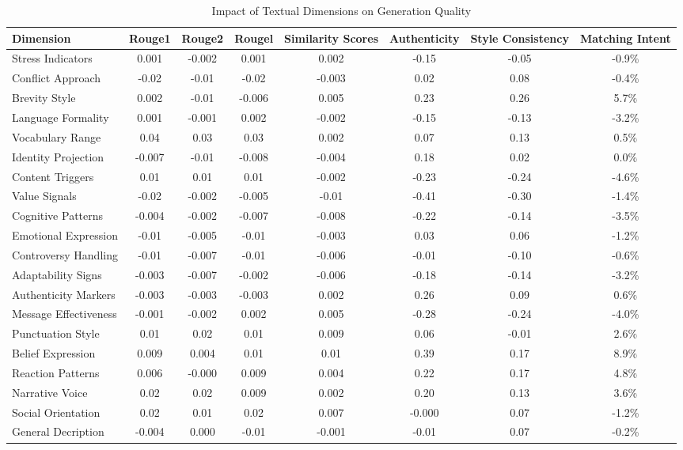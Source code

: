 \begin{table}
\caption{Impact of Textual Dimensions on Generation Quality}
\label{table1}
\begin{tabular}{lccccccc}
\hline
Dimension & Rouge1 & Rouge2 & Rougel & Similarity Scores & Authenticity & Style Consistency & Matching Intent \\
\hline
Stress Indicators & 0.001 & -0.002 & 0.001 & 0.002 & -0.15 & -0.05 & -0.9\% \\
Conflict Approach & -0.02 & -0.01 & -0.02 & -0.003 & 0.02 & 0.08 & -0.4\% \\
Brevity Style & 0.002 & -0.01 & -0.006 & 0.005 & 0.23 & 0.26 & 5.7\% \\
Language Formality & 0.001 & -0.001 & 0.002 & -0.002 & -0.15 & -0.13 & -3.2\% \\
Vocabulary Range & 0.04 & 0.03 & 0.03 & 0.002 & 0.07 & 0.13 & 0.5\% \\
Identity Projection & -0.007 & -0.01 & -0.008 & -0.004 & 0.18 & 0.02 & 0.0\% \\
Content Triggers & 0.01 & 0.01 & 0.01 & -0.002 & -0.23 & -0.24 & -4.6\% \\
Value Signals & -0.02 & -0.002 & -0.005 & -0.01 & -0.41 & -0.30 & -1.4\% \\
Cognitive Patterns & -0.004 & -0.002 & -0.007 & -0.008 & -0.22 & -0.14 & -3.5\% \\
Emotional Expression & -0.01 & -0.005 & -0.01 & -0.003 & 0.03 & 0.06 & -1.2\% \\
Controversy Handling & -0.01 & -0.007 & -0.01 & -0.006 & -0.01 & -0.10 & -0.6\% \\
Adaptability Signs & -0.003 & -0.007 & -0.002 & -0.006 & -0.18 & -0.14 & -3.2\% \\
Authenticity Markers & -0.003 & -0.003 & -0.003 & 0.002 & 0.26 & 0.09 & 0.6\% \\
Message Effectiveness & -0.001 & -0.002 & 0.002 & 0.005 & -0.28 & -0.24 & -4.0\% \\
Punctuation Style & 0.01 & 0.02 & 0.01 & 0.009 & 0.06 & -0.01 & 2.6\% \\
Belief Expression & 0.009 & 0.004 & 0.01 & 0.01 & 0.39 & 0.17 & 8.9\% \\
Reaction Patterns & 0.006 & -0.000 & 0.009 & 0.004 & 0.22 & 0.17 & 4.8\% \\
Narrative Voice & 0.02 & 0.02 & 0.009 & 0.002 & 0.20 & 0.13 & 3.6\% \\
Social Orientation & 0.02 & 0.01 & 0.02 & 0.007 & -0.000 & 0.07 & -1.2\% \\
General Decription & -0.004 & 0.000 & -0.01 & -0.001 & -0.01 & 0.07 & -0.2\% \\

\end{tabular}
\end{table}
